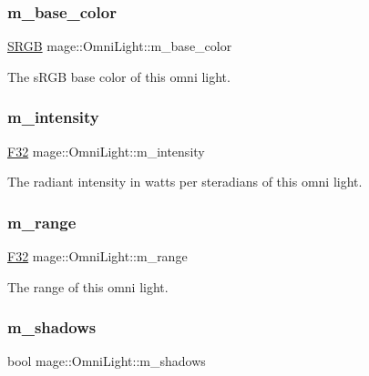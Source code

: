 \subsubsection{\texorpdfstring{m\+\_\+base\+\_\+color}{m\_base\_color}}
{\footnotesize\ttfamily \hyperlink{structmage_1_1_s_r_g_b}{S\+R\+GB} mage\+::\+Omni\+Light\+::m\+\_\+base\+\_\+color\hspace{0.3cm}{\ttfamily [private]}}

The s\+R\+GB base color of this omni light. \hypertarget{classmage_1_1_omni_light_aa0cbdebabf3ce0d8bbaeff7cf88cadd0}{}\label{classmage_1_1_omni_light_aa0cbdebabf3ce0d8bbaeff7cf88cadd0} 
\subsubsection{\texorpdfstring{m\+\_\+intensity}{m\_intensity}}
{\footnotesize\ttfamily \hyperlink{namespacemage_aa97e833b45f06d60a0a9c4fc22ae02c0}{F32} mage\+::\+Omni\+Light\+::m\+\_\+intensity\hspace{0.3cm}{\ttfamily [private]}}

The radiant intensity in watts per steradians of this omni light. \hypertarget{classmage_1_1_omni_light_a0427a9c7f90750c645cd67ef0bafce47}{}\label{classmage_1_1_omni_light_a0427a9c7f90750c645cd67ef0bafce47} 
\subsubsection{\texorpdfstring{m\+\_\+range}{m\_range}}
{\footnotesize\ttfamily \hyperlink{namespacemage_aa97e833b45f06d60a0a9c4fc22ae02c0}{F32} mage\+::\+Omni\+Light\+::m\+\_\+range\hspace{0.3cm}{\ttfamily [private]}}

The range of this omni light. \hypertarget{classmage_1_1_omni_light_a63e5dab12be5021815e98c81dd9aed6a}{}\label{classmage_1_1_omni_light_a63e5dab12be5021815e98c81dd9aed6a} 
\subsubsection{\texorpdfstring{m\+\_\+shadows}{m\_shadows}}
{\footnotesize\ttfamily bool mage\+::\+Omni\+Light\+::m\+\_\+shadows\hspace{0.3cm}{\ttfamily [private]}}

